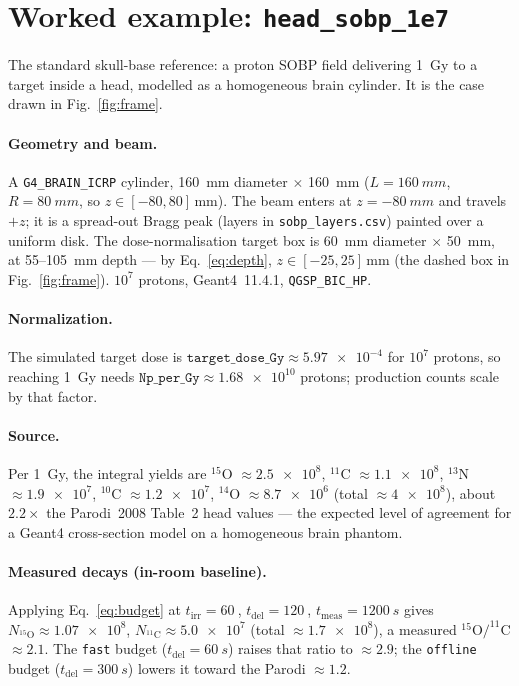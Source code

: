 \documentclass[11pt]{article}
\newcommand{\tirr}{t_{\mathrm{irr}}}
\newcommand{\tdel}{t_{\mathrm{del}}}
\newcommand{\tmeas}{t_{\mathrm{meas}}}
\newcommand{\file}[1]{\texttt{#1}}
\begin{document}
\section{Worked example: \file{head\_sobp\_1e7}}
\label{sec:example}

The standard skull-base reference: a proton SOBP field delivering \SI{1}{Gy} to
a target inside a head, modelled as a homogeneous brain cylinder. It is the case
drawn in Fig.~\ref{fig:frame}.

\paragraph{Geometry and beam.} A \file{G4\_BRAIN\_ICRP} cylinder,
\SI{160}{mm} diameter $\times$ \SI{160}{mm} ($L=\SI{160}{mm}$, $R=\SI{80}{mm}$,
so $z\in[-80,80]\,$\si{mm}). The beam enters at $z=-\SI{80}{mm}$ and travels
$+z$; it is a spread-out Bragg peak (layers in \file{sobp\_layers.csv}) painted
over a uniform disk. The dose-normalisation target box is
\SI{60}{mm} diameter $\times$ \SI{50}{mm}, at \SI{55}{}--\SI{105}{mm} depth ---
by Eq.~\eqref{eq:depth}, $z\in[-25,25]\,$\si{mm} (the dashed box in
Fig.~\ref{fig:frame}). $10^{7}$ protons, Geant4~11.4.1, \file{QGSP\_BIC\_HP}.

\paragraph{Normalization.} The simulated target dose is
$\file{target\_dose\_Gy}\approx\num{5.97e-4}$ for $10^{7}$ protons, so reaching
\SI{1}{Gy} needs $\file{Np\_per\_Gy}\approx\num{1.68e10}$ protons; production
counts scale by that factor.

\paragraph{Source.} Per \SI{1}{Gy}, the integral yields are
$^{15}$O $\approx\num{2.5e8}$, $^{11}$C $\approx\num{1.1e8}$,
$^{13}$N $\approx\num{1.9e7}$, $^{10}$C $\approx\num{1.2e7}$,
$^{14}$O $\approx\num{8.7e6}$ (total $\approx\num{4e8}$), about
$2.2\times$ the Parodi~2008 Table~2 head values --- the expected level of
agreement for a Geant4 cross-section model on a homogeneous brain phantom.

\paragraph{Measured decays (in-room baseline).} Applying Eq.~\eqref{eq:budget} at
$\tirr=\SI{60}{}$, $\tdel=\SI{120}{}$, $\tmeas=\SI{1200}{s}$ gives
$N_{^{15}\mathrm O}\approx\num{1.07e8}$, $N_{^{11}\mathrm C}\approx\num{5.0e7}$
(total $\approx\num{1.7e8}$), a measured $^{15}$O$/^{11}$C $\approx 2.1$. The
\file{fast} budget ($\tdel=\SI{60}{s}$) raises that ratio to $\approx 2.9$; the
\file{offline} budget ($\tdel=\SI{300}{s}$) lowers it toward the Parodi
$\approx1.2$.
\end{document}
